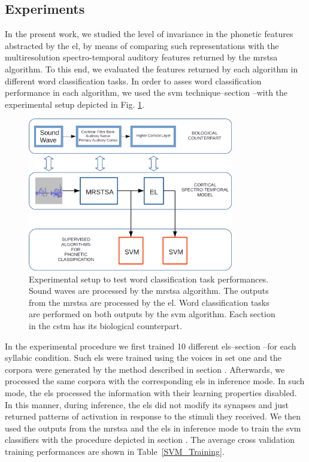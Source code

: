 {\subsection{Experiments}

In the present work, we studied the level of invariance in the phonetic features abstracted by the \gls{el}, by means of comparing such representations with the multiresolution spectro-temporal auditory features returned by the \gls{mrstsa} algorithm. To this end, we evaluated the features returned by each algorithm in different word classification tasks. In order to asses word classification performance in each algorithm, we used the \gls{svm} technique--section --with  the experimental setup depicted in Fig. \ref{fig:Experiment}.

\begin{figure}[h!]
    \centering
    \includegraphics[width=0.8\textwidth]{Experiment.png}
    \caption{Experimental setup to test word classification task performances.
    Sound waves are processed by the \gls{mrstsa} algorithm.
    The outputs from the \gls{mrstsa} are processed by the \gls{el}.
    Word classification tasks are performed on both outputs by the \gls{svm} algorithm.
    Each section in the \gls{cstm} has its biological counterpart.}
    \label{fig:Experiment}
\end{figure}

In the experimental procedure we first trained 10 different \glspl{el}--section --for each syllabic condition. Such \glspl{el} were trained using the voices in set one and the corpora were generated by the method described in section . Afterwards, we processed the same corpora with the corresponding \glspl{el} in inference mode. In such mode, the \glspl{el} processed the information with their learning properties disabled. In this manner, during inference, the \glspl{el} did not modify its synapses and just returned patterns of activation in response to the stimuli they received. We then used the outputs from the \gls{mrstsa} and the \glspl{el} in inference mode to train the \gls{svm} classifiers with the procedure depicted in section . The average cross validation training performances are shown in Table~\ref{SVM_Training}.

}
